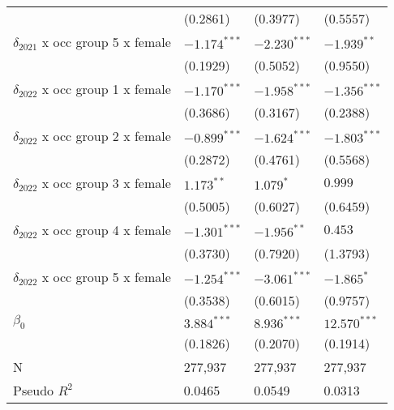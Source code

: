 \begin{tabular}{llll}
                                         &           (0.2861) &           (0.3977) &           (0.5557) \\
$\delta_{2021}$ x occ group 5 x female   &     $-1.174^{***}$ &     $-2.230^{***}$ &      $-1.939^{**}$ \\
                                         &           (0.1929) &           (0.5052) &           (0.9550) \\
$\delta_{2022}$ x occ group 1 x female   &     $-1.170^{***}$ &     $-1.958^{***}$ &     $-1.356^{***}$ \\
                                         &           (0.3686) &           (0.3167) &           (0.2388) \\
$\delta_{2022}$ x occ group 2 x female   &     $-0.899^{***}$ &     $-1.624^{***}$ &     $-1.803^{***}$ \\
                                         &           (0.2872) &           (0.4761) &           (0.5568) \\
$\delta_{2022}$ x occ group 3 x female   &       $1.173^{**}$ &          $1.079^*$ &            $0.999$ \\
                                         &           (0.5005) &           (0.6027) &           (0.6459) \\
$\delta_{2022}$ x occ group 4 x female   &     $-1.301^{***}$ &      $-1.956^{**}$ &            $0.453$ \\
                                         &           (0.3730) &           (0.7920) &           (1.3793) \\
$\delta_{2022}$ x occ group 5 x female   &     $-1.254^{***}$ &     $-3.061^{***}$ &         $-1.865^*$ \\
                                         &           (0.3538) &           (0.6015) &           (0.9757) \\
$\beta_0$                                &      $3.884^{***}$ &      $8.936^{***}$ &     $12.570^{***}$ \\
                                         &           (0.1826) &           (0.2070) &           (0.1914) \\
N                                        &            277,937 &            277,937 &            277,937 \\
Pseudo $R^2$                             &             0.0465 &             0.0549 &             0.0313 \\
\bottomrule
\end{tabular}
